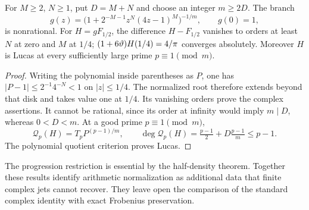 \begin{proposition}
\label{prop:C-algebraic-jet-lucas}
For $M\ge2$, $N\ge1$, put $D=M+N$ and choose an integer $m\ge2D$.
The branch
\[
 g(z)=\bigl(1+2^{-M-1}z^N(4z-1)^M\bigr)^{-1/m},\qquad g(0)=1,
\]
is nonrational. For $H=gF_{1/2}$, the difference $H-F_{1/2}$
vanishes to orders at least $N$ at zero and $M$ at $1/4$;
$(1+6\vartheta)H(1/4)=4/\pi$ converges absolutely. Moreover $H$
is Lucas at every sufficiently large prime $p\equiv1\pmod m$.
\end{proposition}
\begin{proof}
Writing the polynomial inside parentheses as $P$, one has
$|P-1|\le2^{-1}4^{-N}<1$ on $|z|\le1/4$.
The normalized root therefore extends beyond that disk and takes
value one at $1/4$. Its vanishing orders prove the complex assertions.
It cannot be rational, since its order at infinity would imply
$m\mid D$, whereas $0<D<m$. At a good prime $p\equiv1\pmod m$,
\[
 \mathcal Q_p(H)=T_pP^{(p-1)/m},\qquad
 \deg\mathcal Q_p(H)=\tfrac{p-1}{2}+D\tfrac{p-1}{m}\le p-1.
\]
The polynomial quotient criterion proves Lucas.
\end{proof}
The progression restriction is essential by the half-density theorem.
Together these results identify arithmetic normalization as additional
data that finite complex jets cannot recover. They leave open the
comparison of the standard complex identity with exact Frobenius
preservation.
